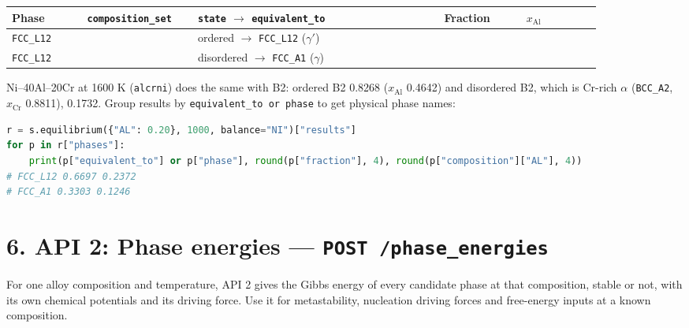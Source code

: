\documentclass[12pt,a4paper]{article}
\begin{document}
\begingroup\small
\begin{longtable}{>{\raggedright\arraybackslash}p{0.112\linewidth}>{\raggedright\arraybackslash}p{0.161\linewidth}>{\raggedright\arraybackslash}p{0.360\linewidth}>{\raggedright\arraybackslash}p{0.121\linewidth}>{\raggedright\arraybackslash}p{0.112\linewidth}}
\toprule
\textbf{Phase} & \textbf{\texttt{composition\_\allowbreak{}set}} & \textbf{\texttt{state} \(\rightarrow\) \texttt{equivalent\_\allowbreak{}to}} & \textbf{Fraction} & \textbf{\(x_{\mathrm{Al}}\)} \\
\midrule
\endhead
\texttt{FCC\_\allowbreak{}L12} & 1 & ordered \(\rightarrow\) \texttt{FCC\_\allowbreak{}L12} (\(\gamma '\)) & 0.6697 & 0.2372 \\
\texttt{FCC\_\allowbreak{}L12} & 2 & disordered \(\rightarrow\) \texttt{FCC\_\allowbreak{}A1} (\(\gamma\)) & 0.3303 & 0.1246 \\
\bottomrule
\end{longtable}
\endgroup
Ni--40Al--20Cr at 1600 K (\texttt{alcrni}) does the same with B2: ordered B2 0.8268 (\(x_{\mathrm{Al}}\) 0.4642) and disordered B2, which is Cr-rich \(\alpha\) (\texttt{BCC\_\allowbreak{}A2}, \(x_{\mathrm{Cr}}\) 0.8811), 0.1732. Group results by \texttt{equivalent\_\allowbreak{}to or phase} to get physical phase names:

\begin{lstlisting}[basicstyle={\scriptsize\ttfamily},language=Python]
r = s.equilibrium({"AL": 0.20}, 1000, balance="NI")["results"]
for p in r["phases"]:
    print(p["equivalent_to"] or p["phase"], round(p["fraction"], 4), round(p["composition"]["AL"], 4))
# FCC_L12 0.6697 0.2372
# FCC_A1 0.3303 0.1246
\end{lstlisting}

\section*{6. API 2: Phase energies --- \texttt{POST /\allowbreak{}phase\_\allowbreak{}energies}}
For one alloy composition and temperature, API 2 gives the Gibbs energy of every candidate phase at that composition, stable or not, with its own chemical potentials and its driving force. Use it for metastability, nucleation driving forces and free-energy inputs at a known composition.
\end{document}
